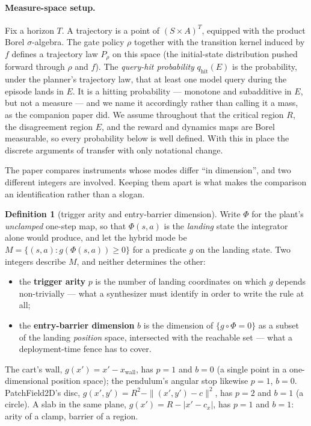 \documentclass[11pt]{article}
\theoremstyle{definition}
\newtheorem{definition}{Definition}
\theoremstyle{remark}
\begin{document}
\paragraph{Measure-space setup.} Fix a horizon $T$. A trajectory is a point of $(S \times A)^T$, equipped with the product Borel $\sigma$-algebra. The gate policy $\rho$ together with the transition kernel induced by $f$ defines a trajectory law $P_\rho$ on this space (the initial-state distribution pushed forward through $\rho$ and $f$). The \emph{query-hit probability} $q_{\mathrm{hit}}(E)$ is the probability, under the planner's trajectory law, that at least one model query during the episode lands in $E$. It is a hitting probability --- monotone and subadditive in $E$, but not a measure --- and we name it accordingly rather than calling it a mass, as the companion paper did. We assume throughout that the critical region $R$, the disagreement region $E$, and the reward and dynamics maps are Borel measurable, so every probability below is well defined. With this in place the discrete arguments of \citet{aguilar2026verified} transfer with only notational change.

The paper compares instruments whose modes differ ``in dimension'', and two different integers are involved. Keeping them apart is what makes the comparison an identification rather than a slogan.

\begin{definition}[trigger arity and entry-barrier dimension]
\label{def:arity}
Write $\Phi$ for the plant's \emph{unclamped} one-step map, so that $\Phi(s,a)$ is the \emph{landing} state the integrator alone would produce, and let the hybrid mode be $M = \{(s,a) : g(\Phi(s,a)) \geq 0\}$ for a predicate $g$ on the landing state. Two integers describe $M$, and neither determines the other:
\begin{itemize}
\item the \textbf{trigger arity} $p$ is the number of landing coordinates on which $g$ depends non-trivially --- what a synthesizer must identify in order to write the rule at all;
\item the \textbf{entry-barrier dimension} $b$ is the dimension of $\{g \circ \Phi = 0\}$ as a subset of the landing \emph{position} space, intersected with the reachable set --- what a deployment-time fence has to cover.
\end{itemize}
The cart's wall, $g(x') = x' - x_\mathrm{wall}$, has $p = 1$ and $b = 0$ (a single point in a one-dimensional position space); the pendulum's angular stop likewise $p = 1$, $b = 0$. PatchField2D's disc, $g(x',y') = R^2 - \|(x',y') - c\|^2$, has $p = 2$ and $b = 1$ (a circle). A slab in the same plane, $g(x') = R - |x' - c_x|$, has $p = 1$ and $b = 1$: arity of a clamp, barrier of a region.
\end{definition}
\end{document}
